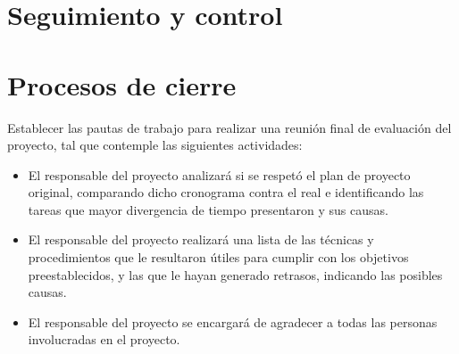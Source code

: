 \documentclass[
12pt,
spanish,
singlespacing,
parskip,
headsepline,]{article}
\begin{document}
\section{Seguimiento y control}

\section{Procesos de cierre}

Establecer las pautas de trabajo para realizar una reunión final de evaluación del proyecto, tal que contemple las siguientes actividades:

\begin{itemize}
	\item El responsable del proyecto analizará si se respetó el plan de proyecto original, comparando dicho cronograma contra el real e identificando las tareas que mayor divergencia de tiempo presentaron y sus causas.
	\item El responsable del proyecto realizará una lista de las técnicas y procedimientos que le resultaron útiles para cumplir con los objetivos preestablecidos, y las que le hayan generado retrasos, indicando las posibles causas.
	\item El responsable del proyecto se encargará de agradecer a todas las personas involucradas en el proyecto.
\end{itemize}
\end{document}
